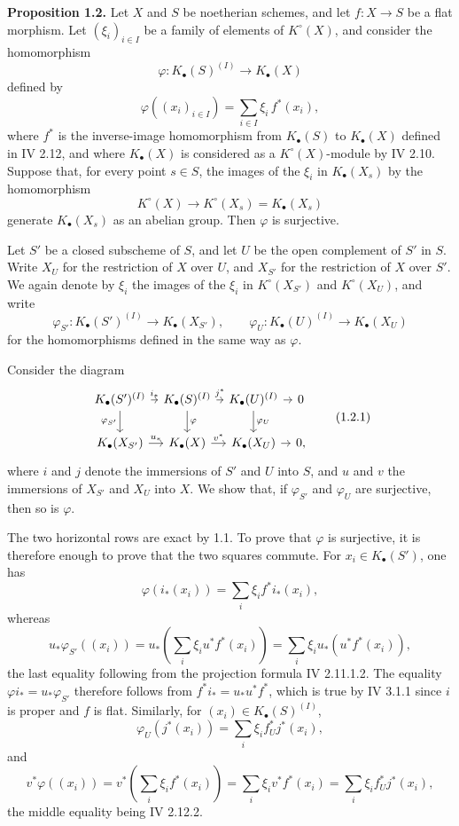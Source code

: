\documentclass[11pt]{article}
\begin{document}
\textbf{Proposition 1.2.} Let $X$ and $S$ be noetherian schemes, and let $f:X\to S$ be a flat morphism. Let $(\xi_i)_{i\in I}$ be a family of elements of $K^\circ(X)$, and consider the homomorphism
\[
 \varphi:K_\bullet(S)^{(I)}\longrightarrow K_\bullet(X)
\]
defined by
\[
 \varphi((x_i)_{i\in I})=\sum_{i\in I}\xi_i\,f^*(x_i),
\]
where $f^*$ is the inverse-image homomorphism from $K_\bullet(S)$ to $K_\bullet(X)$ defined in IV 2.12, and where $K_\bullet(X)$ is considered as a $K^\circ(X)$-module by IV 2.10. Suppose that, for every point $s\in S$, the images of the $\xi_i$ in $K_\bullet(X_s)$ by the homomorphism
\[
 K^\circ(X)\longrightarrow K^\circ(X_s)=K_\bullet(X_s)
\]
generate $K_\bullet(X_s)$ as an abelian group. Then $\varphi$ is surjective.

Let $S'$ be a closed subscheme of $S$, and let $U$ be the open complement of $S'$ in $S$. Write $X_U$ for the restriction of $X$ over $U$, and $X_{S'}$ for the restriction of $X$ over $S'$. We again denote by $\xi_i$ the images of the $\xi_i$ in $K^\circ(X_{S'})$ and $K^\circ(X_U)$, and write
\[
 \varphi_{S'}:K_\bullet(S')^{(I)}\to K_\bullet(X_{S'}),\qquad
 \varphi_U:K_\bullet(U)^{(I)}\to K_\bullet(X_U)
\]
for the homomorphisms defined in the same way as $\varphi$.

Consider the diagram
\[
\begin{tikzcd}[column sep=tiny]
K_\bullet(S')^{(I)} \arrow[r,"i_*"] \arrow[d,"\varphi_{S'}"'] &
K_\bullet(S)^{(I)} \arrow[r,"j^*"] \arrow[d,"\varphi"] &
K_\bullet(U)^{(I)} \arrow[r] \arrow[d,"\varphi_U"] & 0\\
K_\bullet(X_{S'}) \arrow[r,"u_*"] & K_\bullet(X) \arrow[r,"v^*"] & K_\bullet(X_U) \arrow[r] & 0,
\end{tikzcd}\tag{1.2.1}
\]
where $i$ and $j$ denote the immersions of $S'$ and $U$ into $S$, and $u$ and $v$ the immersions of $X_{S'}$ and $X_U$ into $X$. We show that, if $\varphi_{S'}$ and $\varphi_U$ are surjective, then so is $\varphi$.

The two horizontal rows are exact by 1.1. To prove that $\varphi$ is surjective, it is therefore enough to prove that the two squares commute. For $x_i\in K_\bullet(S')$, one has
\[
 \varphi(i_*(x_i))=\sum_i \xi_i f^*i_*(x_i),
\]
whereas
\[
 u_*\varphi_{S'}((x_i))=u_*\left(\sum_i\xi_i u^*f^*(x_i)\right)=\sum_i \xi_i u_*(u^*f^*(x_i)),
\]
the last equality following from the projection formula IV 2.11.1.2. The equality $\varphi i_*=u_*\varphi_{S'}$ therefore follows from $f^*i_*=u_*u^*f^*$, which is true by IV 3.1.1 since $i$ is proper and $f$ is flat. Similarly, for $(x_i)\in K_\bullet(S)^{(I)}$,
\[
 \varphi_U(j^*(x_i))=\sum_i\xi_i f_U^*j^*(x_i),
\]
and
\[
 v^*\varphi((x_i))=v^*\left(\sum_i\xi_i f^*(x_i)\right)=\sum_i\xi_i v^*f^*(x_i)=\sum_i\xi_i f_U^*j^*(x_i),
\]
the middle equality being IV 2.12.2.
\end{document}
